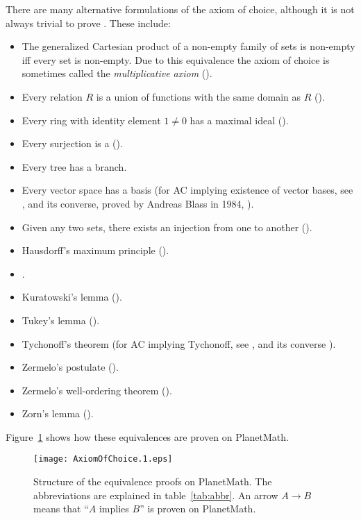 \documentclass{article}
\begin{document}
There are many alternative formulations of the axiom of choice, although it is not always trivial to prove . These include:
\begin{itemize}
\item The generalized Cartesian product of a non-empty family of sets is non-empty iff every set is non-empty.  Due to this equivalence the axiom of choice is sometimes called the \emph{multiplicative axiom} ().
\item Every relation $R$ is a union of functions with the same domain as $R$ ().
\item Every ring with identity element $1\neq 0$ has a maximal ideal ().
\item Every surjection is a  ().
\item Every tree has a branch.
\item Every vector space has a basis (for AC implying existence of vector bases, see , and its converse, proved by Andreas Blass in 1984, ).
\item Given any two sets, there exists an injection from one to another ().
\item Hausdorff's maximum principle ().
\item {}.
\item Kuratowski's lemma ().
\item Tukey's lemma ().
\item Tychonoff's theorem (for AC implying Tychonoff, see , and its converse ).
\item Zermelo's postulate ().
\item Zermelo's well-ordering theorem ().
\item Zorn's lemma ().
\end{itemize}


Figure~\ref{fig:implications} shows how these equivalences are proven on PlanetMath.

\begin{figure}
\label{fig:implications}
\begin{center}
\texttt{[image: AxiomOfChoice.1.eps]}
\end{center}
\sf\caption{Structure of the equivalence proofs on PlanetMath. The
abbreviations are explained in table~\ref{tab:abbr}\@. An arrow
$A\rightarrow B$ means that ``$A$ implies $B$'' is proven on
PlanetMath.}
\end{figure}
\end{document}
